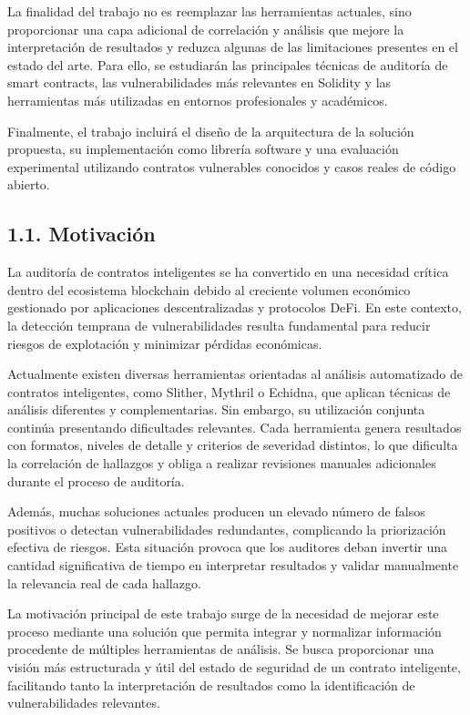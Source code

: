La finalidad del trabajo no es reemplazar las herramientas actuales,
sino proporcionar una capa adicional de correlación y análisis que
mejore la interpretación de resultados y reduzca algunas de las
limitaciones presentes en el estado del arte. Para ello, se estudiarán
las principales técnicas de auditoría de smart contracts, las
vulnerabilidades más relevantes en Solidity y las herramientas más
utilizadas en entornos profesionales y académicos.

Finalmente, el trabajo incluirá el diseño de la arquitectura de la
solución propuesta, su implementación como librería software y una
evaluación experimental utilizando contratos vulnerables conocidos y
casos reales de código abierto.

\subsection{1.1. Motivación}\label{motivaciuxf3n}

La auditoría de contratos inteligentes se ha convertido en una necesidad
crítica dentro del ecosistema blockchain debido al creciente volumen
económico gestionado por aplicaciones descentralizadas y protocolos
DeFi. En este contexto, la detección temprana de vulnerabilidades
resulta fundamental para reducir riesgos de explotación y minimizar
pérdidas económicas.

Actualmente existen diversas herramientas orientadas al análisis
automatizado de contratos inteligentes, como Slither, Mythril o Echidna,
que aplican técnicas de análisis diferentes y complementarias. Sin
embargo, su utilización conjunta continúa presentando dificultades
relevantes. Cada herramienta genera resultados con formatos, niveles de
detalle y criterios de severidad distintos, lo que dificulta la
correlación de hallazgos y obliga a realizar revisiones manuales
adicionales durante el proceso de auditoría.

Además, muchas soluciones actuales producen un elevado número de falsos
positivos o detectan vulnerabilidades redundantes, complicando la
priorización efectiva de riesgos. Esta situación provoca que los
auditores deban invertir una cantidad significativa de tiempo en
interpretar resultados y validar manualmente la relevancia real de cada
hallazgo.

La motivación principal de este trabajo surge de la necesidad de mejorar
este proceso mediante una solución que permita integrar y normalizar
información procedente de múltiples herramientas de análisis. Se busca
proporcionar una visión más estructurada y útil del estado de seguridad
de un contrato inteligente, facilitando tanto la interpretación de
resultados como la identificación de vulnerabilidades relevantes.

